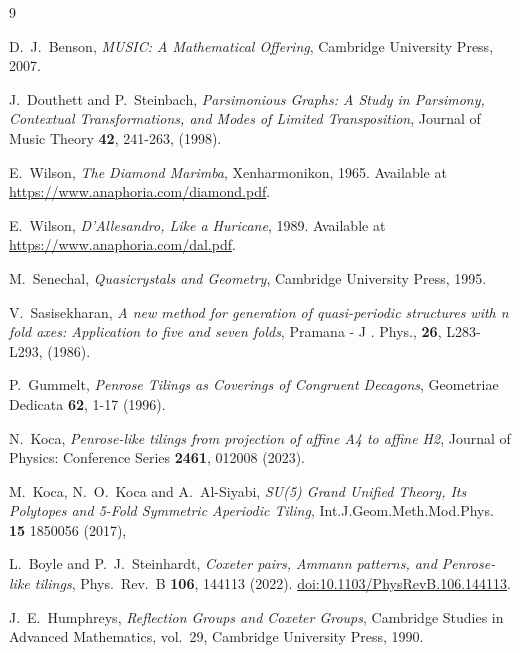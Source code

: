 \documentclass[11pt]{article}
\begin{document}
\begin{thebibliography}{9}

D.~J.~Benson,
\textit{MUSIC: A Mathematical Offering},
Cambridge University Press, 2007.

J.~Douthett and P.~Steinbach,
\textit{Parsimonious Graphs: A Study in Parsimony, Contextual Transformations, and Modes of Limited Transposition},
Journal of Music Theory \textbf{42}, 241-263, (1998).

E.~Wilson,
\textit{The Diamond Marimba},
Xenharmonikon, 1965.
Available at \url{https://www.anaphoria.com/diamond.pdf}.

E.~Wilson,
\textit{D'Allesandro, Like a Huricane}, 1989.
Available at \url{https://www.anaphoria.com/dal.pdf}.

M.~Senechal,
\textit{Quasicrystals and Geometry},
Cambridge University Press, 1995.

V.~Sasisekharan,
\textit{A new method for generation of quasi-periodic structures with n fold axes: Application to five and seven folds},
Pramana - J . Phys., \textbf{26}, L283-L293, (1986).


P.~Gummelt,
\textit{Penrose Tilings as Coverings of Congruent Decagons},
Geometriae Dedicata \textbf{62}, 1-17 (1996).

N.~Koca,
\textit{Penrose-like tilings from projection of affine A4 to affine H2},
Journal of Physics: Conference Series \textbf{2461}, 012008 (2023).


M.~Koca, N.~O.~Koca and A.~Al-Siyabi,
\textit{SU(5) Grand Unified Theory, Its Polytopes and 5-Fold Symmetric Aperiodic Tiling},
Int.J.Geom.Meth.Mod.Phys. \textbf{15} 1850056 (2017), 


L.~Boyle and P.~J.~Steinhardt,
\textit{Coxeter pairs, Ammann patterns, and Penrose-like tilings},
Phys.\ Rev.\ B \textbf{106}, 144113 (2022).
\href{https://doi.org/10.1103/PhysRevB.106.144113}{doi:10.1103/PhysRevB.106.144113}.

J.~E.~Humphreys,
\textit{Reflection Groups and Coxeter Groups},
Cambridge Studies in Advanced Mathematics, vol.\ 29,
Cambridge University Press, 1990.

\end{thebibliography}
\end{document}
